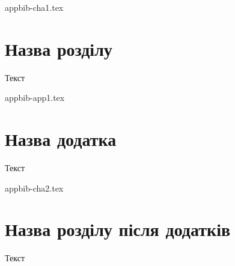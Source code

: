 





\begin{filecontents}{appbib-cha1.tex}
\chapter{Назва розділу}
Текст
\end{filecontents}

\begin{filecontents}{appbib-app1.tex}
\chapter{Назва додатка}
Текст
\end{filecontents}

\begin{filecontents}{appbib-cha2.tex}
\chapter*{Назва розділу після додатків}
Текст
\end{filecontents}


\documentclass{vakthesis}

\usepackage[T2A]{fontenc}
\usepackage[cp1251]{inputenc}
\usepackage[ukrainian]{babel}


\newenvironment{theappendix}{%
  \appendix
}{}



\tableofcontents


\begin{theappendix}
  
\end{theappendix}


